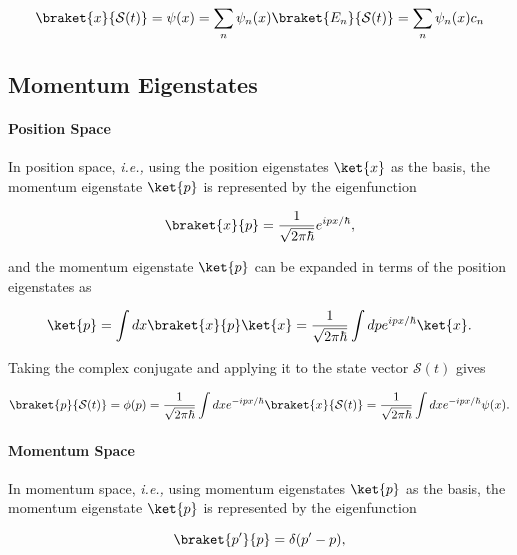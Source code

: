 \documentclass[a4paper,12pt]{report}
\begin{document}
\begin{equation}
  \braket{x}{\mathcal{S}(t)} = \psi (x) = \sum_{n}^{} \psi _{n}(x) \braket{E_{n} }{\mathcal{S}(t)} = \sum_{n}^{} \psi _{n}(x) c_{n}       
\end{equation}

\subsection{Momentum Eigenstates} \label{momeigen} 

\paragraph{Position Space}

In position space, \textit{i.e.,} using the position eigenstates \(\ket{x} \) as the basis, the momentum eigenstate \(\ket{p } \) is represented by the eigenfunction

\begin{equation}
  \braket{x}{p} = \frac{1}{\sqrt{2\pi \hbar } } e^{ipx /\hbar },
\end{equation}

and the momentum eigenstate \(\ket{p} \) can be expanded in terms of the position eigenstates as 

\begin{equation}
  \ket{p} = \int dx \braket{x}{p} \ket{x} = \frac{1}{\sqrt{2\pi \hbar } } \int dp e^{ipx /\hbar } \ket{x} .      
\end{equation}

Taking the complex conjugate and applying it to the state vector \(\mathcal{S}(t)\) gives 

\begin{equation}
  \braket{p}{\mathcal{S}(t)} = \phi (p) = \frac{1}{\sqrt{2\pi \hbar } } \int dx e^{-ipx /\hbar } \braket{x}{\mathcal{S}(t)} = \frac{1}{\sqrt{2\pi \hbar } }  \int dx e^{-ipx /\hbar } \psi (x).   
\end{equation}

\paragraph{Momentum Space}

In momentum space, \textit{i.e.,} using momentum eigenstates \(\ket{p} \) as the basis, the momentum eigenstate \(\ket{p} \) is represented by the eigenfunction

\begin{equation}
  \braket{p'}{p} = \delta (p'-p),
\end{equation}
\end{document}
